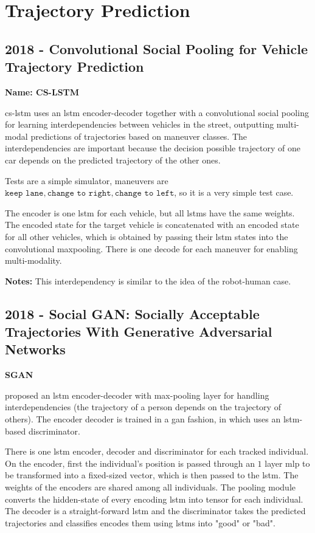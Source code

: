 \section{Trajectory Prediction}\label{sec: traj prediction}

\subsection*{2018 - Convolutional Social Pooling for Vehicle Trajectory Prediction}

\textbf{Name: CS-LSTM}

\cite{deo2018convolutional} \gls{cs-lstm} uses an \gls{lstm} encoder-decoder together with a convolutional social pooling for learning interdependencies between vehicles in the street, outputting multi-modal predictions of trajectories based on maneuver classes.
%
The interdependencies are important because the decision possible trajectory of one car depends on the predicted trajectory of the other ones.

Tests are a simple simulator, maneuvers are ${\texttt{keep lane}, \texttt{change to right}, \texttt{change to left}}$, so it is a very simple test case.

The encoder is one \gls{lstm} for each vehicle, but all \glspl{lstm} have the same weights.
%
The encoded state for the target vehicle is concatenated with an encoded state for all other vehicles, which is obtained by passing their \gls{lstm} states into the convolutional maxpooling.
%
There is one decode for each maneuver for enabling multi-modality.

\textbf{Notes:} This interdependency is similar to the idea of the robot-human case.

\subsection*{2018 - Social GAN: Socially Acceptable Trajectories With Generative Adversarial Networks}

\textbf{SGAN}

\cite{gupta2018social} proposed an \gls{lstm} encoder-decoder with max-pooling layer for handling interdependencies (the trajectory of a person depends on the trajectory of others).
%
The encoder decoder is trained in a \gls{gan} fashion, in which uses an \gls{lstm}-based discriminator.

There is one \gls{lstm} encoder, decoder and discriminator for each tracked individual.
%
On the encoder, first the individual's position is passed through an $1$ layer \gls{mlp} to be transformed into a fixed-sized vector, which is then passed to the \gls{lstm}. The weights of the encoders are shared among all individuals.
%
The pooling module converts the hidden-state of every encoding \gls{lstm} into tensor for each individual.
%
The decoder is a straight-forward \gls{lstm} and the discriminator takes the predicted trajectories and classifies encodes them using \glspl{lstm} into "good" or "bad".

